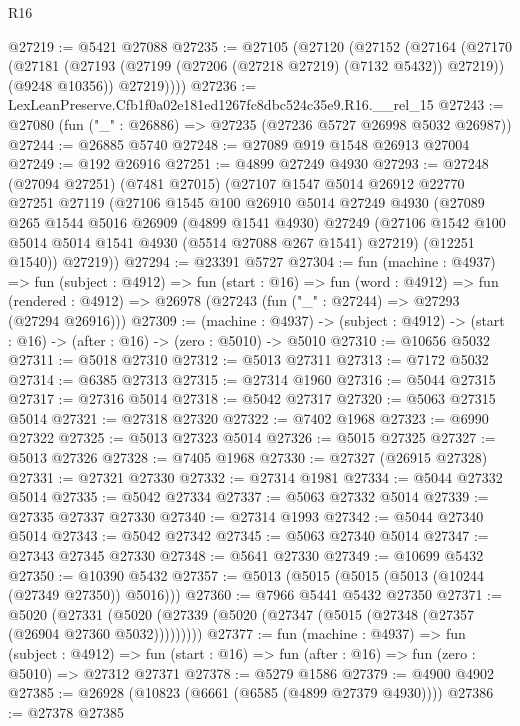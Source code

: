 \begin{lexlean}{R16}
\begin{coremodule}
@27219 := @5421 @27088
@27235 := @27105
    (@27120
      (@27152
        (@27164
          (@27170
            (@27181 (@27193 (@27199 (@27206 (@27218 @27219) (@7132 @5432)) @27219)) (@9248 @10356))
            @27219))))
@27236 := LexLeanPreserve.Cfb1f0a02e181ed1267fc8dbc524c35e9.R16.__rel_15
@27243 := @27080 (fun ("_" : @26886) => @27235 (@27236 @5727 @26998 @5032 @26987))
@27244 := @26885 @5740
@27248 := @27089 @919 @1548 @26913 @27004
@27249 := @192 @26916
@27251 := @4899 @27249 @4930
@27293 := @27248
    (@27094 @27251)
    (@7481 @27015)
    (@27107
      @1547
      @5014
      @26912
      @22770
      @27251
      @27119
      (@27106
        @1545
        @100
        @26910
        @5014
        @27249
        @4930
        (@27089
          @265
          @1544
          @5016
          @26909
          (@4899 @1541 @4930)
          @27249
          (@27106 @1542 @100 @5014 @5014 @1541 @4930 (@5514 @27088 @267 @1541) @27219)
          (@12251 @1540))
        @27219))
@27294 := @23391 @5727
@27304 := fun (machine : @4937) =>
  fun (subject : @4912) =>
  fun (start : @16) =>
  fun (word : @4912) =>
  fun (rendered : @4912) => @26978 (@27243 (fun ("_" : @27244) => @27293 (@27294 @26916)))
@27309 := (machine : @4937) ->
  (subject : @4912) -> (start : @16) -> (after : @16) -> (zero : @5010) -> @5010
@27310 := @10656 @5032
@27311 := @5018 @27310
@27312 := @5013 @27311
@27313 := @7172 @5032
@27314 := @6385 @27313
@27315 := @27314 @1960
@27316 := @5044 @27315
@27317 := @27316 @5014
@27318 := @5042 @27317
@27320 := @5063 @27315 @5014
@27321 := @27318 @27320
@27322 := @7402 @1968
@27323 := @6990 @27322
@27325 := @5013 @27323 @5014
@27326 := @5015 @27325
@27327 := @5013 @27326
@27328 := @7405 @1968
@27330 := @27327 (@26915 @27328)
@27331 := @27321 @27330
@27332 := @27314 @1981
@27334 := @5044 @27332 @5014
@27335 := @5042 @27334
@27337 := @5063 @27332 @5014
@27339 := @27335 @27337 @27330
@27340 := @27314 @1993
@27342 := @5044 @27340 @5014
@27343 := @5042 @27342
@27345 := @5063 @27340 @5014
@27347 := @27343 @27345 @27330
@27348 := @5641 @27330
@27349 := @10699 @5432
@27350 := @10390 @5432
@27357 := @5013 (@5015 (@5015 (@5013 (@10244 (@27349 @27350)) @5016)))
@27360 := @7966 @5441 @5432 @27350
@27371 := @5020
    (@27331 (@5020 (@27339 (@5020 (@27347 (@5015 (@27348 (@27357 (@26904 @27360 @5032)))))))))
@27377 := fun (machine : @4937) =>
  fun (subject : @4912) =>
  fun (start : @16) => fun (after : @16) => fun (zero : @5010) => @27312 @27371
@27378 := @5279 @1586
@27379 := @4900 @4902
@27385 := @26928 (@10823 (@6661 (@6585 (@4899 @27379 @4930))))
@27386 := @27378 @27385

\end{coremodule}
\end{lexlean}
